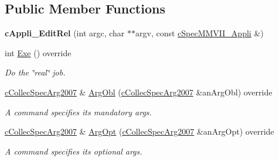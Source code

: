 \subsection*{Public Member Functions}
\begin{DoxyCompactItemize}
\item 
{\bfseries c\+Appli\+\_\+\+Edit\+Rel} (int argc, char $\ast$$\ast$argv, const \hyperlink{classMMVII_1_1cSpecMMVII__Appli}{c\+Spec\+M\+M\+V\+I\+I\+\_\+\+Appli} \&)\hypertarget{classMMVII_1_1cAppli__EditRel_acf605672ae162f6c56a4075fcfc1b06f}{}\label{classMMVII_1_1cAppli__EditRel_acf605672ae162f6c56a4075fcfc1b06f}

\item 
int \hyperlink{classMMVII_1_1cAppli__EditRel_adc91aa1dc8dfb7ed2a46f18d8b6cba48}{Exe} () override\hypertarget{classMMVII_1_1cAppli__EditRel_adc91aa1dc8dfb7ed2a46f18d8b6cba48}{}\label{classMMVII_1_1cAppli__EditRel_adc91aa1dc8dfb7ed2a46f18d8b6cba48}

\begin{DoxyCompactList}\small\item\em Do the \char`\"{}real\char`\"{} job. \end{DoxyCompactList}\item 
\hyperlink{classMMVII_1_1cCollecSpecArg2007}{c\+Collec\+Spec\+Arg2007} \& \hyperlink{classMMVII_1_1cAppli__EditRel_af3363d4f4969ed80dadf7b0bfecf4d56}{Arg\+Obl} (\hyperlink{classMMVII_1_1cCollecSpecArg2007}{c\+Collec\+Spec\+Arg2007} \&an\+Arg\+Obl) override\hypertarget{classMMVII_1_1cAppli__EditRel_af3363d4f4969ed80dadf7b0bfecf4d56}{}\label{classMMVII_1_1cAppli__EditRel_af3363d4f4969ed80dadf7b0bfecf4d56}

\begin{DoxyCompactList}\small\item\em A command specifies its mandatory args. \end{DoxyCompactList}\item 
\hyperlink{classMMVII_1_1cCollecSpecArg2007}{c\+Collec\+Spec\+Arg2007} \& \hyperlink{classMMVII_1_1cAppli__EditRel_a134cee57874d797176f13f0b1e6f8d6e}{Arg\+Opt} (\hyperlink{classMMVII_1_1cCollecSpecArg2007}{c\+Collec\+Spec\+Arg2007} \&an\+Arg\+Opt) override\hypertarget{classMMVII_1_1cAppli__EditRel_a134cee57874d797176f13f0b1e6f8d6e}{}\label{classMMVII_1_1cAppli__EditRel_a134cee57874d797176f13f0b1e6f8d6e}

\begin{DoxyCompactList}\small\item\em A command specifies its optional args. \end{DoxyCompactList}\end{DoxyCompactItemize}

